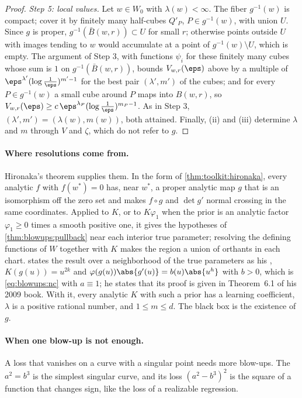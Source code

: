 \begin{refsection}
\begin{proof}
\emph{Step 5: local values.} Let $w\in W_0$ with $\lambda(w)<\infty$. The fiber $g^{-1}(w)$ is compact; cover it by finitely many half-cubes $Q'_P$, $P\in g^{-1}(w)$, with union $U$. Since $g$ is proper, $g^{-1}(\bar B(w,r))\subset U$ for small $r$; otherwise points outside $U$ with images tending to $w$ would accumulate at a point of $g^{-1}(w)\setminus U$, which is empty. The argument of Step 3, with functions $\psi_i$ for these finitely many cubes whose sum is $1$ on $g^{-1}(\bar B(w,r))$, bounds $V_{w,r}(\eps)$ above by a multiple of $\eps^{\lambda'}(\log\frac1\eps)^{m'-1}$ for the best pair $(\lambda',m')$ of the cubes; and for every $P\in g^{-1}(w)$ a small cube around $P$ maps into $B(w,r)$, so $V_{w,r}(\eps)\ge c\,\eps^{\lambda_P}(\log\frac1\eps)^{m_P-1}$. As in Step 3, $(\lambda',m')=(\lambda(w),m(w))$, both attained. Finally, (ii) and (iii) determine $\lambda$ and $m$ through $V$ and $\zeta$, which do not refer to $g$.
\end{proof}

\paragraph{Where resolutions come from.} Hironaka's theorem supplies them. In the form of \cref{thm:toolkit:hironaka}, every analytic $f$ with $f(w^*)=0$ has, near $w^*$, a proper analytic map $g$ that is an isomorphism off the zero set and makes $f\circ g$ and $\det g'$ normal crossing in the same coordinates. Applied to $K$, or to $K\varphi_1$ when the prior is an analytic factor $\varphi_1\ge0$ times a smooth positive one, it gives the hypotheses of \cref{thm:blowups:pullback} near each interior true parameter; resolving the defining functions of $W$ together with $K$ makes the region a union of orthants in each chart. \Textcite[Theorem~1]{Watanabe2013} states the result over a neighborhood of the true parameters as his , $K(g(u))=u^{2k}$ and $\varphi(g(u))\abs{g'(u)}=b(u)\abs{u^h}$ with $b>0$, which is \eqref{eq:blowups:nc} with $a\equiv1$; he states that its proof is given in Theorem~6.1 of his 2009 book. With it, every analytic $K$ with such a prior has a learning coefficient, $\lambda$ is a positive rational number, and $1\le m\le d$. The black box is the existence of $g$.

\paragraph{When one blow-up is not enough.} A loss that vanishes on a curve with a singular point needs more blow-ups. The  $a^2=b^3$ is the simplest singular curve, and its loss $(a^2-b^3)^2$ is the square of a function that changes sign, like the loss of a realizable regression.


\end{refsection}
